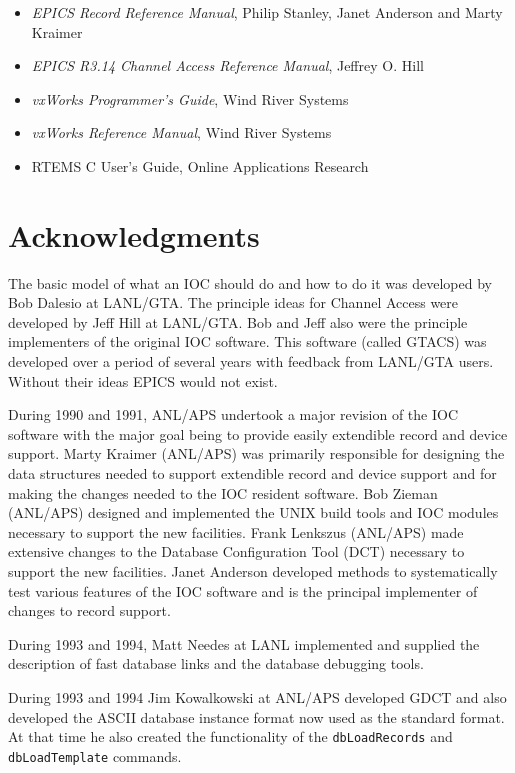 \begin{itemize}
\item \emph{EPICS Record Reference Manual}, Philip Stanley, Janet Anderson and Marty Kraimer

\item \emph{EPICS R3.14 Channel Access Reference Manual}, Jeffrey O. Hill

\item \emph{vxWorks Programmer's Guide}, Wind River Systems

\item \emph{vxWorks Reference Manual}, Wind River Systems

\item RTEMS C User's Guide, Online Applications Research

\end{itemize}

\section{Acknowledgments}

The basic model of what an IOC should do and how to do it was developed by Bob Dalesio at LANL/GTA.
The principle ideas for Channel Access were developed by Jeff Hill at LANL/GTA.
Bob and Jeff also were the principle implementers of the original IOC software.
This software (called GTACS) was developed over a period of several years with feedback from LANL/GTA users.
Without their ideas EPICS would not exist.

During 1990 and 1991, ANL/APS undertook a major revision of the IOC software with the major goal being to provide easily extendible record and device support.
Marty Kraimer (ANL/APS) was primarily responsible for designing the data structures needed to support extendible record and device support and for making the changes needed to the IOC resident software.
Bob Zieman (ANL/APS) designed and implemented the UNIX build tools and IOC modules necessary to support the new facilities.
Frank Lenkszus (ANL/APS) made extensive changes to the Database Configuration Tool (DCT) necessary to support the new facilities.
Janet Anderson developed methods to systematically test various features of the IOC software and is the principal implementer of changes to record support.

During 1993 and 1994, Matt Needes at LANL implemented and supplied the description of fast database links and the database debugging tools.

During 1993 and 1994 Jim Kowalkowski at ANL/APS developed GDCT and also developed the ASCII database instance format now used as the standard format.
At that time he also created the functionality of the \verb|dbLoadRecords| and \verb|dbLoadTemplate| commands.

